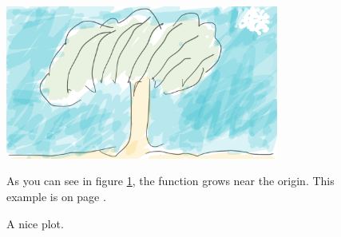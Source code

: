 \documentclass[12pt, letterpaper]{article}
\begin{document}
            \begin{figure}[h]
            \centering
            \includegraphics[width=0.8\textwidth]{tree.png}
            \caption{A nice plot.}
            \label{fig:tree1}
            As you can see in figure \ref{fig:tree1}, the function grows near the origin. This example is on page \pageref{fig:tree1}.
            \end{figure}
            
\end{document}
